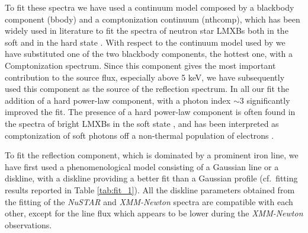 \documentclass{aa}
\begin{document}
To fit these spectra we have used a continuum model composed by a blackbody 
component (bbody) and a comptonization continuum (nthcomp), which has been
widely used in literature to fit the spectra of neutron star LMXBs both in
the soft and in the hard state \citep[see e.g.][]{Egron.etal:13}. 
With respect to the continuum model used by \citet{Miller.etal:13} we have
substituted one of the two blackbody components, the hottest one, 
with a Comptonization spectrum. Since this component gives the most important 
contribution to the source flux, especially above 5 keV, we have 
subsequently used this component as the source of the reflection spectrum.
In all our fit the addition of a hard power-law component, with a photon
index $\sim 3$ significantly improved the fit. The presence of a hard 
power-law component is often found in the spectra of bright LMXBs in
the soft state \citep[see e.g.][]{Piraino.etal:07, Pintore.etal:15, 
Pintore.etal:16}, and has been interpreted as comptonization
of soft photons off a non-thermal population of electrons 
\citep[see e.g.][]{DiSalvo.et:00}. 

To fit the reflection component, which is dominated by a prominent iron
line, we have first used a phenomenological model consisting of a Gaussian
line or a diskline, with a diskline providing a better fit than a Gaussian
profile (cf.\ fitting results reported in Table \ref{tab:fit_1}).
All the diskline parameters obtained from the fitting of the \emph{NuSTAR} 
and \emph{XMM-Newton} spectra are compatible with each other, except for the 
line flux which appears to be lower during the \emph{XMM-Newton}
observations.
\end{document}

